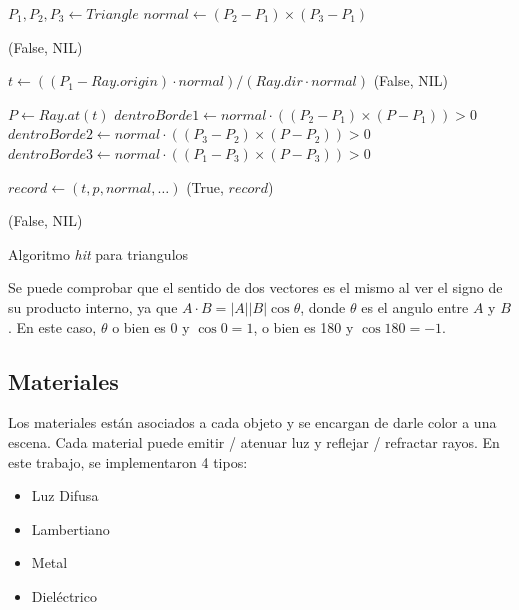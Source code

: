\begin{algorithm}[H]
\begin{algorithmic}[1]
    \State $P_1, P_2, P_3 \gets Triangle$ 
    \State $normal \gets (P_2 - P_1) \times (P_3 - P_1)$
    
        \State \Return (False, NIL) 
    \EndIf

    \State $t \gets ((P_1 - Ray.origin) \cdot normal) / (Ray.dir \cdot normal)$
        \State \Return (False, NIL)
    \EndIf

    \State $P \gets Ray.at(t)$ 
    \State $dentroBorde1 \gets normal \cdot ((P_2 - P_1) \times (P - P_1)) > 0$
    \State $dentroBorde2 \gets normal \cdot ((P_3 - P_2) \times (P - P_2)) > 0$
    \State $dentroBorde3 \gets normal \cdot ((P_1 - P_3) \times (P - P_3)) > 0$


        \State $record \gets (t, p, normal, \dots)$
        \State \Return (True, $record$)
    \EndIf

    \State \Return (False, NIL)
\EndFunction
\end{algorithmic}
\caption{Algoritmo \textit{hit} para triangulos}
\label{alg:triangle-hit}
\end{algorithm}

Se puede comprobar que el sentido de dos vectores es el mismo al ver el signo de
su producto interno, ya que $A \cdot B = \vert A \vert \vert B \vert
\cos{\theta}$, donde $\theta$ es el angulo entre $A$ y $B$. En este caso,
$\theta$ o bien es 0 y $\cos{0} = 1$, o bien es 180 y $\cos{180}=-1$.

\subsection{Materiales}

Los materiales están asociados a cada objeto y se encargan de darle color a una
escena. Cada material puede emitir / atenuar luz y reflejar / refractar
rayos. En este trabajo, se implementaron 4 tipos:

\begin{itemize}
    \item Luz Difusa
    \item Lambertiano
    \item Metal
    \item Dieléctrico
\end{itemize}

